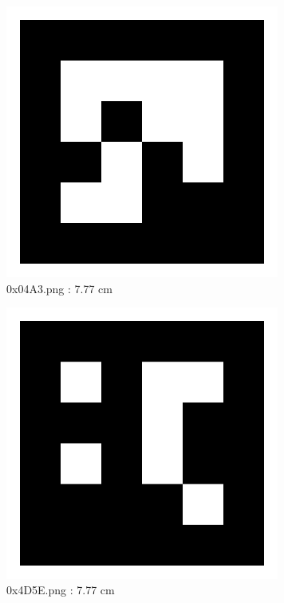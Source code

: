 \documentclass[11pt,a4,BCOR=0cm]{scrartcl}
\begin{document}
\begin{figure}
  \centering
    \includegraphics[natwidth=400,natheight=400,width=9cm]{0x04A3.png}
    \caption{0x04A3.png : 7.77 cm}
    \label{fig:0x04A3.png}
  
\end{figure} 

\begin{figure}
  \centering
    \includegraphics[natwidth=400,natheight=400,width=9cm]{0x4D5E.png}
    \caption{0x4D5E.png : 7.77 cm}
    \label{fig:0x4D5E.png}
  
\end{figure} 

\clearpage
\end{document}
